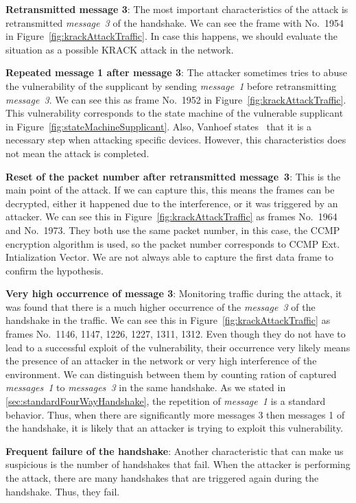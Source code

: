 \begin{description}
\item \textbf{Retransmitted message 3}: The most important characteristics of the attack is retransmitted \textit{message~3} of the handshake. We can see the frame with No.~1954 in Figure~\ref{fig:krackAttackTraffic}. In case this happens, we should evaluate the situation as a possible KRACK attack in the network. 
\item \textbf{Repeated message 1 after message 3}: The attacker sometimes tries to abuse the vulnerability of the supplicant by sending \textit{message~1} before retransmitting \textit{message~3}. We can see this as frame No.~1952 in Figure~\ref{fig:krackAttackTraffic}. This vulnerability corresponds to the state machine of the vulnerable supplicant in Figure~\ref{fig:stateMachineSupplicant}. Also, Vanhoef states~\cite{VA_ccs2017} that it is a necessary step when attacking specific devices. However, this characteristics does not mean the attack is completed.
\item \textbf{Reset of the packet number after retransmitted message~3}: This is the main point of the attack. If we can capture this, this means the frames can be decrypted, either it happened due to the interference, or it was triggered by an attacker. We can see this in Figure~\ref{fig:krackAttackTraffic} as frames No.~1964 and No.~1973. They both use the same packet number, in this case, the CCMP encryption algorithm is used, so the packet number corresponds to CCMP Ext. Intialization Vector. We are not always able to capture the first data frame to confirm the hypothesis.
\item \textbf{Very high occurrence of message 3}: Monitoring traffic during the attack, it was found that there is a much higher occurrence of the \textit{message~3} of the handshake in the traffic. We can see this in Figure~\ref{fig:krackAttackTraffic} as frames No.~1146, 1147, 1226, 1227, 1311, 1312. Even though they do not have to lead to a successful exploit of the vulnerability, their occurrence very likely means the presence of an attacker in the network or very high interference of the environment. We can distinguish between them by counting ration of captured \textit{messages~1} to \textit{messages~3} in the same handshake. As we stated in \ref{sec:standardFourWayHandshake}, the repetition of \textit{message~1} is a standard behavior. Thus, when there are significantly more messages 3 then messages 1 of the handshake, it is likely that an attacker is trying to exploit this vulnerability.
\item \textbf{Frequent failure of the handshake}: Another characteristic that can make us suspicious is the number of handshakes that fail. When the attacker is performing the attack, there are many handshakes that are triggered again during the handshake. Thus, they fail. 
\end{description}

